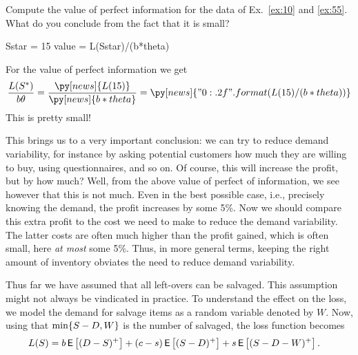\begin{exercise}
Compute the value of perfect information for the data of Ex.~\ref{ex:10} and \ref{ex:55}. What do you conclude from the fact that it is small?
\begin{solution}
\begin{pycode}[news]
Sstar = 15
value = L(Sstar)/(b*theta)
\end{pycode}
For the value of perfect information we get
\begin{equation*}
 \frac{L(\Q^*)}{b \theta} = \frac{\py[news]{L(15)}}{\py[news]{b*theta}} = 
\py[news]{"{0:.2f}".format(L(15)/(b*theta))}
\end{equation*}
This is pretty small! 

This brings us to a very important conclusion: we can try to reduce  demand variability, for instance  by asking potential customers how much they are willing to buy, using questionnaires, and so on. Of course, this will increase the profit, but by how much? Well, from the above value of perfect of information, we see however that this is not much. Even in the best possible case, i.e., precisely knowing the demand, the profit increases by some 5\%. Now we should compare this extra profit to the cost we need to make to reduce the demand variability. The latter costs are often much higher than the profit gained, which is often small, here \emph{at most} some 5\%. Thus, in more general terms, keeping the right amount of inventory obviates the need to reduce demand variability.
\end{solution}
\end{exercise}

Thus far we have assumed that all left-overs can be salvaged. This assumption might not always be vindicated in practice. To understand the effect on the loss, we model the demand for salvage items as a random variable denoted by $W$. Now, using that  $\min\{S-D, W\}$ is the number of  salvaged, the loss function becomes
\begin{align*}
L(S) 
 &= b\,\mathsf{E}\left[(D-S)^+\right] + (c-s) \,\mathsf{E}\left[(S-D)^+\right] + s \,\mathsf{E}\left[(S-D- W)^+\right].
\end{align*}

